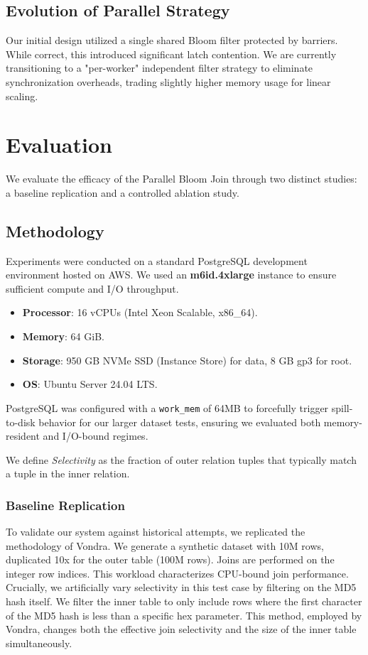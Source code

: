 \documentclass[sigconf,nonacm]{acmart}
\begin{document}
\subsection{Evolution of Parallel Strategy}
Our initial design utilized a single shared Bloom filter protected by barriers. While correct, this introduced significant latch contention. We are currently transitioning to a "per-worker" independent filter strategy to eliminate synchronization overheads, trading slightly higher memory usage for linear scaling.




\section{Evaluation}

We evaluate the efficacy of the Parallel Bloom Join through two distinct studies: a baseline replication and a controlled ablation study.

\subsection{Methodology}
Experiments were conducted on a standard PostgreSQL development environment hosted on AWS. We used an \textbf{m6id.4xlarge} instance to ensure sufficient compute and I/O throughput.
\begin{itemize}
    \item \textbf{Processor}: 16 vCPUs (Intel Xeon Scalable, x86\_64).
    \item \textbf{Memory}: 64 GiB.
    \item \textbf{Storage}: 950 GB NVMe SSD (Instance Store) for data, 8 GB gp3 for root.
    \item \textbf{OS}: Ubuntu Server 24.04 LTS.
\end{itemize}
PostgreSQL was configured with a \texttt{work\_mem} of 64MB to forcefully trigger spill-to-disk behavior for our larger dataset tests, ensuring we evaluated both memory-resident and I/O-bound regimes.

We define \textit{Selectivity} as the fraction of outer relation tuples that typically match a tuple in the inner relation.

\subsubsection{Baseline Replication}
To validate our system against historical attempts, we replicated the methodology of Vondra. We generate a synthetic dataset with 10M rows, duplicated 10x for the outer table (100M rows). Joins are performed on the integer row indices. This workload characterizes CPU-bound join performance. 
Crucially, we artificially vary selectivity in this test case by filtering on the MD5 hash itself. We filter the inner table to only include rows where the first character of the MD5 hash is less than a specific hex parameter. This method, employed by Vondra, changes both the effective join selectivity and the size of the inner table simultaneously.
\end{document}
